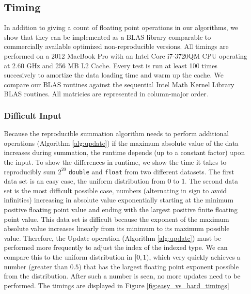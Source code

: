 \subsection{Timing}
  In addition to giving a count of floating point operations in our algorithms, we show that they can be implemented as a BLAS library comparable to commercially available optimized non-reproducible versions.
  All timings are performed on a 2012 MacBook Pro with an Intel Core i7-3720QM CPU operating at 2.60 GHz and 256 MB L2 Cache. Every test is run at least 100 times succesively to amortize the data loading time and warm up the cache. We compare our BLAS routines against the sequential Intel Math Kernel Library BLAS routines. All matricies are represented in column-major order.
  \subsubsection{Difficult Input}
    Because the reproducible summation algorithm needs to perform additional operations (Algorithm \ref{alg:update}) if the maximum absolute value of the data increases during summation, the runtime depends (up to a constant factor) upon the input. To show the differences in runtime, we show the time it takes to reproducibly sum $2^20$ \texttt{double} and \texttt{float} from two different datasets. The first data set is an easy case, the uniform distribution from 0 to 1. The second data set is the most difficult possible case, numbers (alternating in sign to avoid infinities) increasing in absolute value exponentially starting at the minimum positive floating point value and ending with the largest positive finite floating point value. This data set is difficult because the exponent of the maximum absolute value increases linearly from its minimum to its maximum possible value. Therefore, the Update operation (Algorithm \ref{alg:update}) must be performed more frequently to adjust the index of the indexed type. We can compare this to the uniform distribution in $[0, 1)$, which very quickly achieves a number (greater than $0.5$) that has the largest floating point exponent possible from the distribution. After such a number is seen, no more updates need to be performed. The timings are displayed in Figure \ref{fig:easy_vs_hard_timings}

